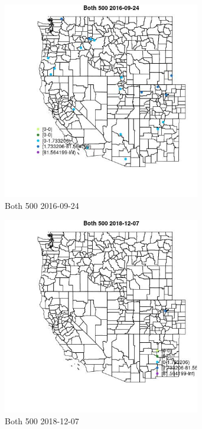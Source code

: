 \begin{figure} 
\centering  
\includegraphics[width=0.77\textwidth]{Code_Outputs/Report_ML_input_PM25_Step4_part_e_de_duplicated_aves_MapObsBoth_5002016-09-24.jpg} 
\caption{\label{fig:Report_ML_input_PM25_Step4_part_e_de_duplicated_avesMapObsBoth_5002016-09-24}Both 500 2016-09-24} 
\end{figure} 
 

\begin{figure} 
\centering  
\includegraphics[width=0.77\textwidth]{Code_Outputs/Report_ML_input_PM25_Step4_part_e_de_duplicated_aves_MapObsBoth_5002018-12-07.jpg} 
\caption{\label{fig:Report_ML_input_PM25_Step4_part_e_de_duplicated_avesMapObsBoth_5002018-12-07}Both 500 2018-12-07} 
\end{figure} 
 

